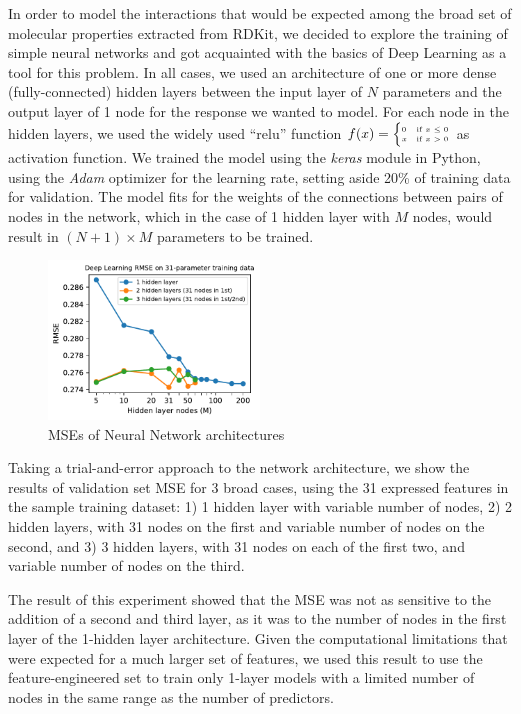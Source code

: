 \documentclass[11pt]{article}
\begin{document}
In order to model the interactions that would be expected among the broad set of molecular properties extracted from RDKit, we decided to explore the training of simple neural networks and got acquainted with the basics of Deep Learning as a tool for this problem. In all cases, we used an architecture of one or more dense (fully-connected) hidden layers between the input layer of $N$ parameters and the output layer of 1 node for the response we wanted to model. For each node in the hidden layers, we used the widely used ``relu'' function $ f(x) = {\tiny \begin{cases} 0 & \text{if } x \le 0 \\ x & \text{if } x>0 \end{cases}}$ as activation function. We trained the model using the \emph{keras} module in Python, using the \emph{Adam} optimizer for the learning rate, setting aside 20\% of training data for validation. The model fits for the weights of the connections between pairs of nodes in the network, which in the case of 1 hidden layer with $M$ nodes, would result in $(N + 1) \times M$ parameters to be trained.

\begin{figure}
\centering
\includegraphics[width=0.5\textwidth]{DL_mse_AC.pdf}
\caption{MSEs of Neural Network architectures}
\label{fig:DL_mse}
\end{figure}

Taking a trial-and-error approach to the network architecture, we show the results of validation set MSE for 3 broad cases, using the 31 expressed features in the sample training dataset: 1) 1 hidden layer with variable number of nodes, 2) 2 hidden layers, with 31 nodes on the first and variable number of nodes on the second, and 3) 3 hidden layers, with 31 nodes on each of the first two, and variable number of nodes on the third.

The result of this experiment showed that the MSE was not as sensitive to the addition of a second and third layer, as it was to the number of nodes in the first layer of the 1-hidden layer architecture. Given the computational limitations that were expected for a much larger set of features, we used this result to use the feature-engineered set to train only 1-layer models with a limited number of nodes in the same range as the number of predictors.
\end{document}
